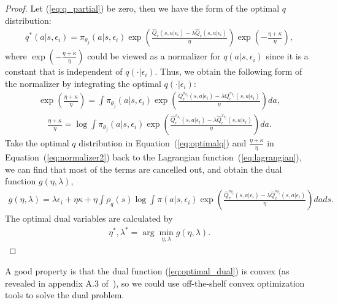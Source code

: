 \begin{proof}
Let (\ref{eq:q_partial}) be zero, then we have the form of the optimal $q$ distribution:
\begin{align}
    q^*(a|s, \epsilon_i) = {\pi_{\theta_j}}(a|s, \epsilon_i) \exp\left(\frac{\hat{Q}_r(s,a|\epsilon_i) - \lambda \hat{Q}_c(s,a|\epsilon_i)}{\eta}\right) \exp\left(-\frac{\eta+\kappa}{\eta}\right),
    \label{eq:optimalq}
\end{align}
where $\exp\left(-\frac{\eta+\kappa}{\eta}\right)$ could be viewed as a normalizer for $q(a|s, \epsilon_i)$ since it is a constant that is independent of $q(\cdot | \epsilon_i)$. Thus, we obtain the following form of the normalizer by integrating the optimal $q(\cdot | \epsilon_i)$:
\begin{align}
    \exp\left(\frac{\eta+\kappa}{\eta}\right) = \int \pi_{\theta_j}(a|s, \epsilon_i) \exp\left(\frac{Q_r^{\pi_{\theta_j}}(s,a|\epsilon_i) - \lambda Q_c^{\pi_{\theta_j}}(s,a|\epsilon_i)}{\eta}\right) da,
    \label{eq:normalizer}
\end{align}
\begin{align}
    \frac{\eta+\kappa}{\eta} = \log\int {\pi_{\theta_j}}(a|s, \epsilon_i) \exp\left(\frac{\hat{Q}^{\pi_{\theta_j}}_r(s,a | \epsilon_i) - \lambda \hat{Q}^{\pi_{\theta_j}}_c(s,a| \epsilon_i)}{\eta}\right) da.
    \label{eq:normalizer2}
\end{align}
Take the optimal $q$ distribution in Equation~(\ref{eq:optimalq}) and $\frac{\eta+\kappa}{\eta}$ in Equation~(\ref{eq:normalizer2}) back to the Lagrangian function~(\ref{eq:lagrangian}), we can find that most of the terms are cancelled out, and obtain the dual function $g(\eta, \lambda)$,
\begin{align}
    g(\eta, \lambda) = \lambda \epsilon_i + \eta \kappa + \eta \int \rho_q(s) \log \int \pi(a|s, \epsilon_i) \exp\left(\frac{\hat{Q}^{\pi_{\theta_j}}_r(s,a | \epsilon_i) - \lambda \hat{Q}^{\pi_{\theta_j}}_c(s,a | \epsilon_i)}{\eta}\right) da ds.
    \label{eq:dual}
\end{align}
The optimal dual variables are calculated by
\begin{align}
   \eta^*, \lambda^* = \arg\min_{\eta, \lambda} g(\eta, \lambda).
\label{eq:optimal_dual}
\end{align}
\end{proof}
A good property is that the dual function (\ref{eq:optimal_dual}) is convex (as revealed in appendix A.3 of~\cite{liu2022constrained}), so we could use off-the-shelf convex optimization tools to solve the dual problem.